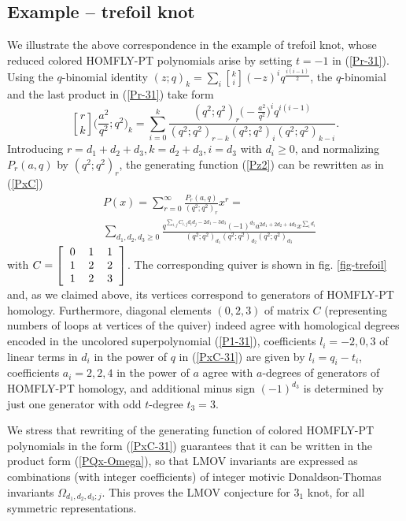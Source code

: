 \documentclass[
 reprint,
 amsmath,amssymb,
 aps,prl
]{revtex4-1}
\begin{document}

\subsection{Example -- trefoil knot}

We illustrate the above correspondence in the example of trefoil knot, whose reduced colored HOMFLY-PT polynomials arise by setting $t=-1$ in (\ref{Pr-31}). Using the $q$-binomial identity $(z;q)_k=\sum_i {k \brack i} (-z)^i q^{\frac{i(i-1)}{2}}$, the $q$-binomial and the last product in (\ref{Pr-31}) take form
$$
{r \brack k} \big(\frac{a^2}{q^2};q^2\big)_k = \sum_{i=0}^k \frac{(q^2;q^2)_r  \big( - \frac{a^2}{q^2} \big)^i q^{i(i-1)} }{(q^2;q^2)_{r-k} (q^2;q^2)_i (q^2;q^2)_{k-i}}.
$$
Introducing $r=d_1+d_2+d_3, k=d_2+d_3, i=d_3$ with $d_i\geq 0$, and normalizing $P_r(a,q)$ by $(q^2;q^2)_r$, the generating function (\ref{Pz2}) can be rewritten as in (\ref{PxC})
\begin{align}
&P(x) = \sum_{r=0}^{\infty} \frac{P_r(a,q)}{(q^2;q^2)_r} x^r = \nonumber \\
&\sum_{d_1,d_2,d_3\geq 0} \frac{q^{\sum_{i,j} C_{i,j} d_i d_j  -2d_1-3d_3} (-1)^{d_3} a^{2d_1+2d_2+4d_3} x^{\sum_i d_i}  }{(q^2;q^2)_{d_1} (q^2;q^2)_{d_2} (q^2;q^2)_{d_3}}   \label{PxC-31}
\end{align}
with $
C = 
\left[
\begin{tabular}{ccc}
0 & 1 & 1 \\
1 & 2 & 2 \\
1 & 2 & 3 \\
\end{tabular}
\right]$. The corresponding quiver is shown in fig. \ref{fig-trefoil} and, as we claimed above, its vertices correspond to generators of HOMFLY-PT homology. Furthermore, diagonal elements $(0,2,3)$ of matrix $C$ (representing numbers of loops at vertices of the quiver) indeed agree with homological degrees encoded in the uncolored superpolynomial (\ref{P1-31}), coefficients $l_i=-2,0,3$ of linear terms in $d_i$ in the power of $q$ in (\ref{PxC-31}) are given by $l_i=q_i-t_i$, coefficients $a_i=2,2,4$ in the power of $a$ agree with $a$-degrees of generators of HOMFLY-PT homology, and additional minus sign $(-1)^{d_3}$ is determined by just one generator with odd $t$-degree $t_3=3$.

We stress that rewriting of the generating function of colored HOMFLY-PT polynomials in the form (\ref{PxC-31}) guarantees that it can be written in the product form (\ref{PQx-Omega}), so that LMOV invariants are expressed as combinations (with integer coefficients) of integer motivic Donaldson-Thomas invariants $\Omega_{d_1,d_2,d_3;j}$. This proves the LMOV conjecture for $3_1$ knot, for all symmetric representations.
\end{document}
